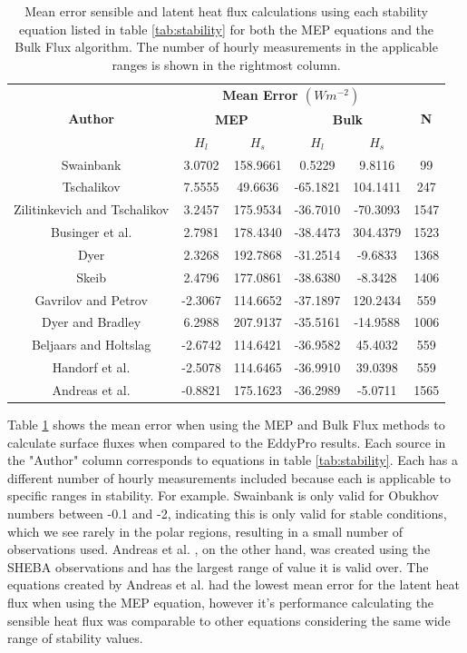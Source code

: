 \begin{table}[H]
\centering
{
\begin{tabular}{| c | c | c | c | c | c |}
 \hline
\multirow{3}{*}{\textbf{Author}} & \multicolumn{4}{c|}{\textbf{Mean Error $\left(W m^{-2}\right)$}} &  \multirow{3}{*}{\textbf{N}} \\
  & \multicolumn{2}{c|}{\textbf{MEP}} & \multicolumn{2}{c|}{\textbf{Bulk}} & \\
  & $H_{l}$ & $H_{s}$ & $H_{l}$ & $H_{s}$ & \\
 \hline
 Swainbank & 3.0702 & 158.9661 & 0.5229 & 9.8116 & 99 \\ 
 Tschalikov & 7.5555 & 49.6636 & -65.1821 & 104.1411 & 247 \\  
 Zilitinkevich and Tschalikov & 3.2457 & 175.9534 & -36.7010 & -70.3093 & 1547 \\
 Businger et al. & 2.7981 & 178.4340 & -38.4473 & 304.4379 & 1523 \\
 Dyer & 2.3268 & 192.7868 & -31.2514 & -9.6833 & 1368 \\
 Skeib & 2.4796 & 177.0861 & -38.6380 & -8.3428 & 1406 \\
 Gavrilov and Petrov & -2.3067 & 114.6652 & -37.1897 & 120.2434 & 559 \\
 Dyer and Bradley & 6.2988 & 207.9137 & -35.5161 & -14.9588 & 1006 \\
 Beljaars and Holtslag & -2.6742 & 114.6421 & -36.9582 & 45.4032 & 559 \\
 Handorf et al. & -2.5078 & 114.6465 & -36.9910 & 39.0398 & 559 \\
 Andreas et al. & -0.8821 & 175.1623 & -36.2989 & -5.0711 & 1565 \\
 \hline
\end{tabular}}
\caption{Mean error sensible and latent heat flux calculations using each stability equation listed in table \ref{tab:stability} for both the MEP equations and the Bulk Flux algorithm. The number of hourly measurements in the applicable ranges is shown in the rightmost column.}
\label{tab:stability_error}
\end{table}

Table \ref{tab:stability_error} shows the mean error when using the MEP and Bulk Flux methods to calculate surface fluxes when compared to the EddyPro results. Each source in the "Author" column corresponds to equations in table \ref{tab:stability}. Each has a different number of hourly measurements included because each is applicable to specific ranges in stability. For example. Swainbank \cite{foken:2008} is only valid for Obukhov numbers between -0.1 and -2, indicating this is only valid for stable conditions, which we see rarely in the polar regions, resulting in a small number of observations used. Andreas et al. \cite{andreas:311}, on the other hand, was created using the SHEBA observations and has the largest range of value it is valid over. The equations created by Andreas et al. \cite{andreas:311} had the lowest mean error for the latent heat flux when using the MEP equation, however it's performance calculating the sensible heat flux was comparable to other equations considering the same wide range of stability values. 

